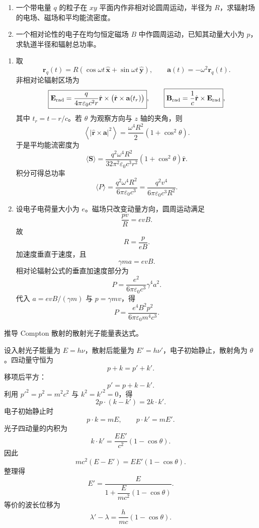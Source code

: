 \begin{question}[圆周运动电荷的辐射与同步辐射功率]
\begin{enumerate}
  \item 一个带电量 $q$ 的粒子在 $xy$ 平面内作非相对论圆周运动，半径为 $R$，求辐射场的电场、磁场和平均能流密度。
  \item 一个相对论性的电子在均匀恒定磁场 $B$ 中作圆周运动，已知其动量大小为 $p$，求轨道半径和辐射总功率。
\end{enumerate}
\begin{solution}
\begin{enumerate}
  \item 取
  \[
    \mathbf r_q(t)=R(\cos\omega t\,\hat{\mathbf x}+\sin\omega t\,\hat{\mathbf y}),
    \qquad
    \mathbf a(t)=-\omega^2\mathbf r_q(t) .
  \]
  非相对论辐射区场为
  \[
    \boxed{\mathbf E_{\rm rad}=\frac{q}{4\pi\varepsilon_0c^2r}
    \hat{\mathbf r}\times\bigl(\hat{\mathbf r}\times\mathbf a(t_r)\bigr)},
    \qquad
    \boxed{\mathbf B_{\rm rad}=\frac1c\hat{\mathbf r}\times\mathbf E_{\rm rad}},
  \]
  其中 $t_r=t-r/c$。若 $\theta$ 为观察方向与 $z$ 轴的夹角，则
  \[
    \left\langle |\hat{\mathbf r}\times\mathbf a|^2\right\rangle
    =\frac{\omega^4R^2}{2}(1+\cos^2\theta) .
  \]
  于是平均能流密度为
  \[
    \boxed{\langle\mathbf S\rangle
    =\frac{q^2\omega^4R^2}{32\pi^2\varepsilon_0c^3r^2}
    (1+\cos^2\theta)\hat{\mathbf r}} .
  \]
  积分可得总功率
  \[
    \langle P\rangle=\frac{q^2\omega^4R^2}{6\pi\varepsilon_0c^3}
    =\frac{q^2v^4}{6\pi\varepsilon_0c^3R^2} .
  \]

  \item 设电子电荷量大小为 $e$。磁场只改变动量方向，圆周运动满足
  \[
    \frac{pv}{R}=evB .
  \]
  故
  \[
    \boxed{R=\frac{p}{eB}} .
  \]
  加速度垂直于速度，且
  \[
    \gamma ma=evB .
  \]
  相对论辐射公式的垂直加速度部分为
  \[
    P=\frac{e^2}{6\pi\varepsilon_0c^3}\gamma^4a^2 .
  \]
  代入 $a=evB/(\gamma m)$ 与 $p=\gamma mv$，得
  \[
    \boxed{P=\frac{e^4B^2p^2}{6\pi\varepsilon_0m^4c^3}} .
  \]
\end{enumerate}
\end{solution}
\end{question}

\begin{question}[Compton 散射]
推导 Compton 散射的散射光子能量表达式。
\begin{solution}
设入射光子能量为 $E=h\nu$，散射后能量为 $E'=h\nu'$，电子初始静止，散射角为 $\theta$。四动量守恒为
\[
  p+k=p'+k' .
\]
移项后平方：
\[
  p'=p+k-k' .
\]
利用 $p'^2=p^2=m^2c^2$ 与 $k^2=k'^2=0$，得
\[
  2p\cdot(k-k')=2k\cdot k' .
\]
电子初始静止时
\[
  p\cdot k=mE,
  \qquad
  p\cdot k'=mE' .
\]
光子四动量的内积为
\[
  k\cdot k'=\frac{EE'}{c^2}(1-\cos\theta) .
\]
因此
\[
  mc^2(E-E')=EE'(1-\cos\theta) .
\]
整理得
\[
  \boxed{E'=\frac{E}{1+\dfrac{E}{mc^2}(1-\cos\theta)}} .
\]
等价的波长位移为
\[
  \boxed{\lambda'-\lambda=\frac{h}{mc}(1-\cos\theta)} .
\]
\end{solution}
\end{question}

